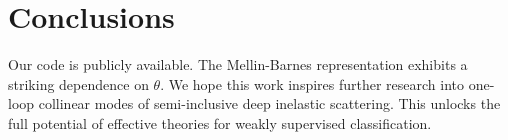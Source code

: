 \section{Conclusions}\label{sec:conclusions}

Our code is publicly available. The Mellin-Barnes representation
exhibits a striking dependence on $\theta$. We hope this work inspires
further research into one-loop collinear modes of semi-inclusive deep
inelastic scattering. This unlocks the full potential of effective
theories for weakly supervised classification.

